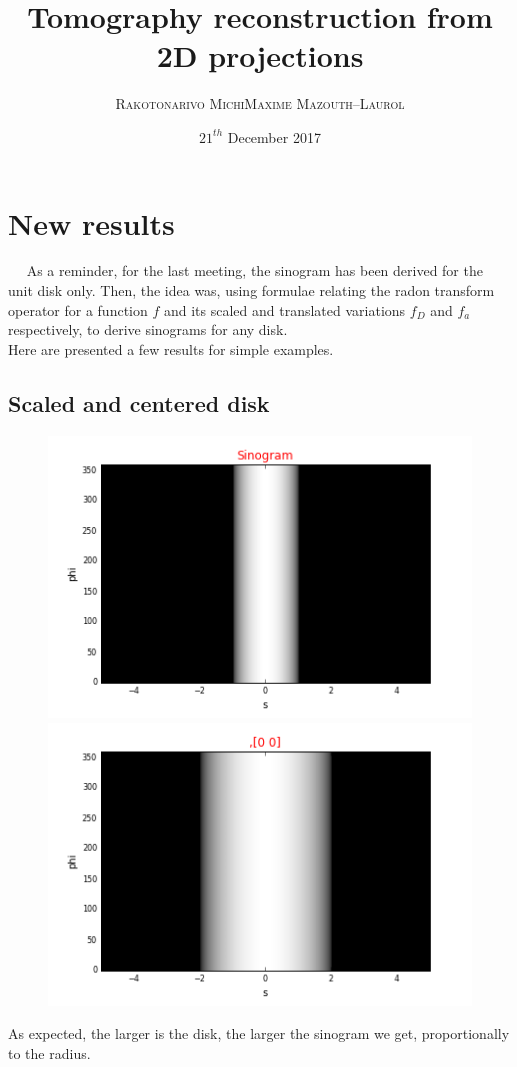\documentclass[a4,12pt]{article}
\title{\textbf{Tomography reconstruction from 2D projections}}
\author{
\begin{tabular}{cc}
	\textsc{Rakotonarivo Michi} & \textsc{Maxime Mazouth--Laurol}
\end{tabular}}
\date{\small $21^{th}$ December 2017}
\begin{document}
\maketitle
\section{New results}
~~ As a reminder, for the last meeting, the sinogram has been derived for the unit disk only. Then, the idea was, using formulae relating the radon transform operator for a function $f$ and its scaled and translated variations $f_{D}$ and $f_{a}$ respectively, to derive sinograms for any disk. \\
Here are presented a few results for simple examples.
\subsection{Scaled and centered disk}
\begin{figure}[h!]
   \begin{minipage}[c]{.46\linewidth}
      \includegraphics[scale=0.5]{../images/sinograms/unitDisk.png} 
   \end{minipage} \hfill
   \begin{minipage}[c]{.46\linewidth}
      \includegraphics[scale=0.5]{../images/sinograms/scaledUnitDisk.png} 
   \end{minipage}
\end{figure}
As expected, the larger is the disk, the larger the sinogram we get, proportionally to the radius.
\end{document}
